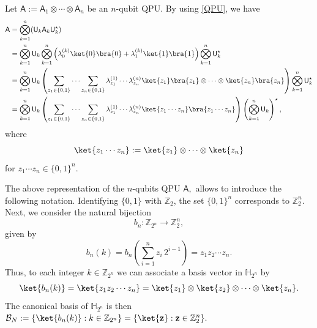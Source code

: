 \documentclass[a4paper,11pt]{article}
\newcommand{\rU}{\mathsf{U}}
\newcommand{\rA}{\mathsf{A}}
\begin{document}
Let $\rA:= \rA_1 \otimes \cdots \otimes \rA_n$ be an $n$-qubit QPU. By using \eqref{QPU}, we have
\begin{align*}
\rA & = \bigotimes_{k=1}^n (\rU_k \rA_k \rU_k^{\star}) \\
& =\bigotimes_{k=1}^n \rU_k \bigotimes_{k=1}^n \left(\lambda_{0}^{(k)} \ket{0}\bra{0} + \lambda_{1}^{(k)} \ket{1}\bra{1}\right) \bigotimes_{k=1}^n \rU_k^{\star} \\ 
& = \bigotimes_{k=1}^n \rU_k \left(\sum_{z_1\in \{0,1\}} \cdots \sum_{z_n \in \{0,1\}}\lambda_{z_1}^{(1)} \cdots \lambda_{z_n}^{(n)} \ket{z_1}\bra{z_1} \otimes \cdots \otimes \ket{z_n}\bra{z_n} \right) \bigotimes_{k=1}^n \rU_k^{\star} \\
& = \bigotimes_{k=1}^n \rU_k \left(\sum_{z_1\in \{0,1\}} \cdots \sum_{z_n \in \{0,1\}}\lambda_{z_1}^{(1)} \cdots \lambda_{z_n}^{(n)} \ket{z_1\cdots z_n}\bra{z_1 \cdots z_{n}}  \right) \left(\bigotimes_{k=1}^n \rU_k\right)^{\star},
\end{align*}
where 
$$
\ket{z_1\cdots z_n}:=\ket{z_1} \otimes \cdots \otimes \ket{z_n} 
$$
for $z_1\cdots z_n\in \{0,1\}^n.$ 

\bigskip

The above representation of the $n$-qubits QPU $\rA,$ allows to introduce the following notation. Identifying \(\{0,1\}\) with \(\mathbb{Z}_2\), the set \(\{0,1\}^n\) corresponds to \(\mathbb{Z}_2^n\). Next, we consider the natural bijection
\[
b_n : \mathbb{Z}_{2^n} \to \mathbb{Z}_2^n,
\]
given by
\[
b_n(k) = b_n\left(\sum_{i=1}^{n} z_i\,2^{i-1}\right) = z_1 z_2 \cdots z_n.
\]
Thus, to each integer \(k \in \mathbb{Z}_{2^n}\) we can associate a basis vector in \(\mathbb{H}_{2^n}\) by
\[
\ket{b_n(k)} = \ket{z_1 z_2 \cdots z_n} = \ket{z_1} \otimes \ket{z_2} \otimes \cdots \otimes \ket{z_n}.
\]
The canonical basis of \(\mathbb{H}_{2^n}\) is then
\(
\mathcal{B}_N := \{\ket{b_n(k)} : k \in \mathbb{Z}_{2^n}\} = \{\ket{\mathbf{z}} : \mathbf{z} \in \mathbb{Z}_2^n\}.
\)

\bigskip
\end{document}
